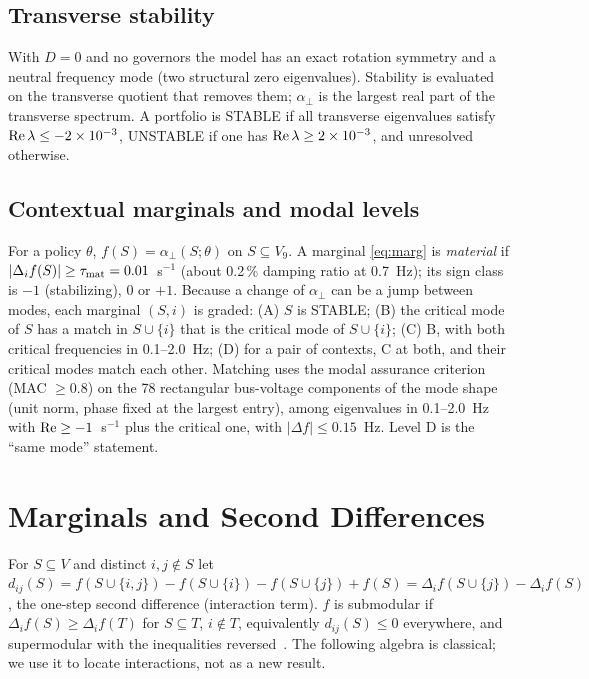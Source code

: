 \documentclass[journal]{IEEEtran}
\theoremstyle{remark}
\newcommand{\aperp}{\alpha_{\perp}}
\begin{document}
\subsection{Transverse stability}
With $D=0$ and no governors the model has an exact rotation symmetry and a
neutral frequency mode (two structural zero eigenvalues). Stability is evaluated
on the transverse quotient that removes them; $\aperp$ is the largest real part
of the transverse spectrum. A portfolio is STABLE if all transverse eigenvalues
satisfy ${\rm Re}\,\lambda\le-2\times10^{-3}$, UNSTABLE if one has
${\rm Re}\,\lambda\ge2\times10^{-3}$, and unresolved otherwise.

\subsection{Contextual marginals and modal levels}
For a policy $\theta$, $f(S)=\aperp(S;\theta)$ on $S\subseteq V_9$. A marginal
\eqref{eq:marg} is \emph{material} if $|\Delta_if(S)|\ge\tau_{\rm mat}=0.01$~s$^{-1}$
(about 0.2\,\% damping ratio at 0.7~Hz); its sign class is $-1$ (stabilizing),
$0$ or $+1$. Because a change of $\aperp$ can be a jump between modes, each
marginal $(S,i)$ is graded: (A) $S$ is STABLE; (B) the critical mode of $S$ has a
match in $S\cup\{i\}$ that is the critical mode of $S\cup\{i\}$; (C) B, with both
critical frequencies in 0.1--2.0~Hz; (D) for a pair of contexts, C at both, and
their critical modes match each other. Matching uses the modal assurance
criterion (MAC $\ge0.8$) on the 78 rectangular bus-voltage components of the mode
shape (unit norm, phase fixed at the largest entry), among eigenvalues in
0.1--2.0~Hz with ${\rm Re}\ge-1$~s$^{-1}$ plus the critical one, with
$|\Delta f|\le0.15$~Hz. Level D is the ``same mode'' statement.

\section{Marginals and Second Differences}\label{sec:theory}

For $S\subseteq V$ and distinct $i,j\notin S$ let
$d_{ij}(S)=f(S\cup\{i,j\})-f(S\cup\{i\})-f(S\cup\{j\})+f(S)=\Delta_if(S\cup\{j\})-\Delta_if(S)$,
the one-step second difference (interaction term). $f$ is submodular if
$\Delta_if(S)\ge\Delta_if(T)$ for $S\subseteq T$, $i\notin T$, equivalently
$d_{ij}(S)\le0$ everywhere, and supermodular with the inequalities
reversed~\cite{topkis1978,lovasz1983,fujishige2005,bach2013}. The following
algebra is classical; we use it to locate interactions, not as a new result.
\end{document}
